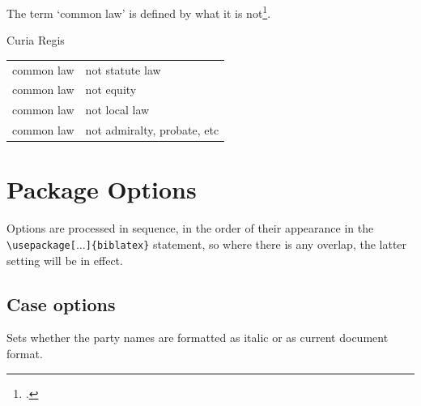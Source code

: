 

The term `common law' is defined by what it is not\footcite[section 41]{bishop}.

Curia Regis
\begin{tabular}{ll}
common law & not statute law \\
common law & not equity \\
common law & not local law\\
common law & not admiralty, probate, etc \\
\end{tabular}

\section{Package Options}
\label{packopt}
Options are processed in sequence, in the order of their appearance in the \texttt{\textbackslash usepackage[$\ldots$]\{biblatex\}} statement, so where there is any overlap, the latter setting will be in effect.
\bigskip

\subsection{Case options}

Sets whether the party names are formatted as italic or as current document format.
\bigskip

